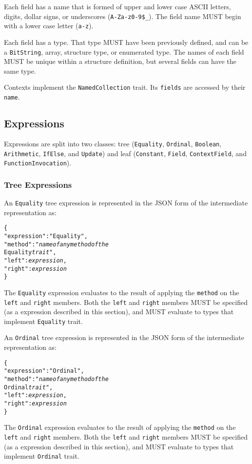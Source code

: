 \documentclass[10pt,twocolumn,a4paper]{article}
\newcommand{\code}[1]{\texttt{#1}}
\begin{document}
Each field has a name that is formed of upper and lower case ASCII letters,
digits, dollar signs, or underscores (\code{A-Za-z0-9\$\_}). The field name
MUST begin with a lower case letter (\code{a-z}).

Each field has a type. That type MUST have been previously defined, and can
be a \code{BitString}, array, structure type, or enumerated type. The names
of each field MUST be unique within a structure definition, but several
fields can have the same type.

Contexts implement the \code{NamedCollection} trait. Its \code{fields} are
accessed by their \code{name}.

\subsection{Expressions}
\label{sec:expressions}

Expressions are split into two classes: 
tree (\code{Equality}, \code{Ordinal}, \code{Boolean}, \code{Arithmetic}, \code{IfElse}, and
\code{Update})
and 
leaf (\code{Constant}, \code{Field}, \code{ContextField}, and \code{FunctionInvocation}).

\subsubsection{Tree Expressions}

An \code{Equality} tree expression is represented in the JSON form of the
intermediate representation as:
\footnotesize
\begin{alltt}
  \{
    "expression"   : "Equality",
    "method"       : "\emph{name of any method of the}
                     Equality \emph{trait}",
    "left"         : \emph{expression},
    "right"        : \emph{expression}
  \}
\end{alltt}
\normalsize
The \code{Equality} expression evaluates to the result of applying the \code{method} on
the \code{left} and \code{right} members.
Both the \code{left} and \code{right} members MUST be specified (as a expression described
in this section), and MUST evaluate to types that implement \code{Equality} trait.

An \code{Ordinal} tree expression is represented in the JSON form of the
intermediate representation as:
\footnotesize
\begin{alltt}
  \{
    "expression"   : "Ordinal",
    "method"       : "\emph{name of any method of the}
                     Ordinal \emph{trait}",
    "left"         : \emph{expression},
    "right"        : \emph{expression}
  \}
\end{alltt}
\normalsize
The \code{Ordinal} expression evaluates to the result of applying the \code{method} on
the \code{left} and \code{right} members.
Both the \code{left} and \code{right} members MUST be specified (as a expression described
in this section), and MUST evaluate to types that implement \code{Ordinal} trait.
\end{document}
